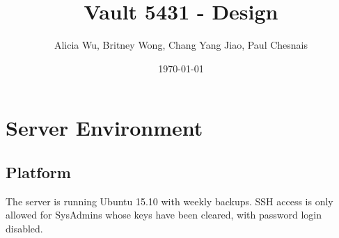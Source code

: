 \documentclass{article}
\title{Vault 5431 - Design}
\author{Alicia Wu, Britney Wong, Chang Yang Jiao, Paul Chesnais}
\date{\today}
\begin{document}
\maketitle
\thispagestyle{empty}

\section{Server Environment}
\label{sec:server_environment}

\subsection{Platform}
\label{sub:platform}
\par The server is running Ubuntu 15.10 with weekly backups. SSH access is only allowed for SysAdmins whose keys have been cleared, with password login disabled.
\end{document}
